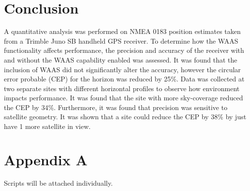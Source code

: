 \documentclass[11pt]{article}
\begin{document}
\section{Conclusion}

A quantitative analysis was performed on NMEA 0183 position estimates taken from a Trimble Juno SB handheld GPS receiver. To determine how the WAAS functionality affects performance, the precision and accuracy of the receiver with and without the WAAS capability enabled was assessed. It was found that the inclusion of WAAS did not significantly alter the accuracy, however the circular error probable (CEP) for the horizon was reduced by 25\%. Data was collected at two separate sites with different horizontal profiles to observe how environment impacts performance. It was found that the site with more sky-coverage reduced the CEP by 34\%. Furthermore, it was found that precision was sensitive to satellite geometry. It was shown that a site could reduce the CEP by 38\% by just have 1 more satellite in view. 



  

\section{Appendix A}
Scripts will be attached individually.
\end{document}
